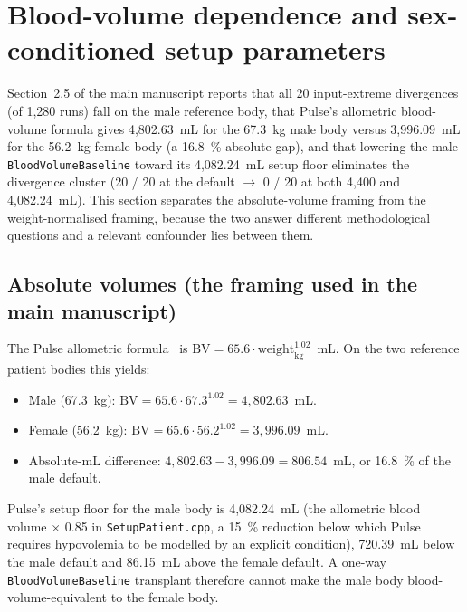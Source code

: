\documentclass[pdflatex,sn-nature]{sn-jnl}%
\newcommand{\mainref}[2]{#2}
\begin{document}

\section{Blood-volume dependence and sex-conditioned setup parameters}\label{sec:s10}

Section~\mainref{sec:results-sex}{2.5} of the main manuscript reports that all 20 input-extreme divergences (of 1{,}280 runs) fall on the male reference body, that Pulse's allometric blood-volume formula gives 4{,}802.63~mL for the 67.3~kg male body versus 3{,}996.09~mL for the 56.2~kg female body (a 16.8~\% absolute gap), and that lowering the male \texttt{BloodVolumeBaseline} toward its 4{,}082.24~mL setup floor eliminates the divergence cluster (20 / 20 at the default $\rightarrow$ 0 / 20 at both 4{,}400 and 4{,}082.24~mL). This section separates the absolute-volume framing from the weight-normalised framing, because the two answer different methodological questions and a relevant confounder lies between them.

\subsection{Absolute volumes (the framing used in the main manuscript)}\label{sec:s10-abs}

The Pulse allometric formula~\cite{pulsepatientmethod} is $\text{BV} = 65.6 \cdot \text{weight}_{\text{kg}}^{1.02}$~mL. On the two reference patient bodies this yields:

\begin{itemize}
\item Male (67.3~kg): $\text{BV} = 65.6 \cdot 67.3^{1.02} = 4{,}802.63$~mL.
\item Female (56.2~kg): $\text{BV} = 65.6 \cdot 56.2^{1.02} = 3{,}996.09$~mL.
\item Absolute-mL difference: $4{,}802.63 - 3{,}996.09 = 806.54$~mL, or 16.8~\% of the male default.
\end{itemize}

Pulse's setup floor for the male body is 4{,}082.24~mL (the allometric blood volume $\times$ 0.85 in \texttt{SetupPatient.cpp}, a 15~\% reduction below which Pulse requires hypovolemia to be modelled by an explicit condition), 720.39~mL below the male default and 86.15~mL above the female default. A one-way \texttt{BloodVolumeBaseline} transplant therefore cannot make the male body blood-volume-equivalent to the female body.
\end{document}
